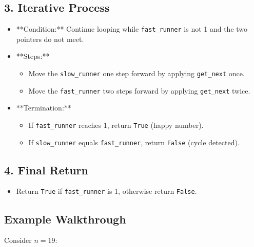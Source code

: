 \subsection*{3. Iterative Process}

\begin{itemize}
    \item **Condition:** Continue looping while \texttt{fast\_runner} is not 1 and the two pointers do not meet.
    \item **Steps:**
    \begin{itemize}
        \item Move the \texttt{slow\_runner} one step forward by applying \texttt{get\_next} once.
        \item Move the \texttt{fast\_runner} two steps forward by applying \texttt{get\_next} twice.
    \end{itemize}
    \item **Termination:**
    \begin{itemize}
        \item If \texttt{fast\_runner} reaches 1, return \texttt{True} (happy number).
        \item If \texttt{slow\_runner} equals \texttt{fast\_runner}, return \texttt{False} (cycle detected).
    \end{itemize}
\end{itemize}

\subsection*{4. Final Return}

\begin{itemize}
    \item Return \texttt{True} if \texttt{fast\_runner} is 1, otherwise return \texttt{False}.
\end{itemize}

\subsection*{Example Walkthrough}

Consider \(n = 19\):

